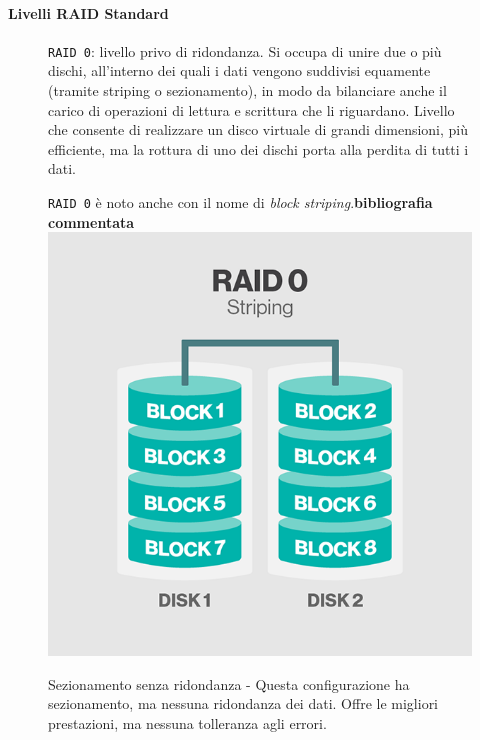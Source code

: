 \paragraph{Livelli RAID Standard}
\begin{itemize}
\begin{figure}[htbp]
\item 
\verb"RAID 0": livello privo di ridondanza. Si occupa di unire due o pi\`{u} dischi, all'interno dei quali i dati vengono suddivisi equamente (tramite striping o sezionamento), in modo da bilanciare anche il carico di operazioni di lettura e scrittura che li riguardano. Livello che consente di realizzare un disco virtuale di grandi dimensioni, pi\`{u} efficiente, ma la rottura di uno dei dischi porta alla perdita di tutti i dati. 

\verb"RAID 0" \`{e} noto anche con il nome di \textit{block striping}.\textbf{bibliografia commentata}\\

\centering
\includegraphics[scale=0.40]{img/raid00.png}\\
\caption{Sezionamento senza ridondanza - Questa configurazione ha sezionamento, ma nessuna ridondanza dei dati. Offre le migliori prestazioni, ma nessuna tolleranza agli errori.\label{figura1.3}\cite{etichetta9}}
\end{figure}


\end{itemize}
